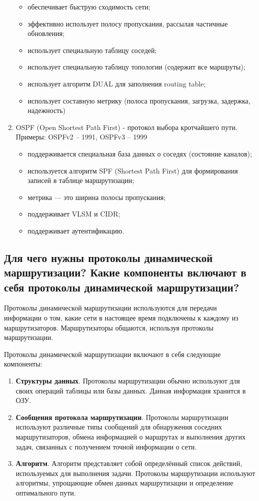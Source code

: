 \begin{enumerate}
\begin{itemize}
		\item обеспечивает быструю сходимость сети;
		\item эффективно использует полосу пропускания,
			рассылая частичные обновления;
		\item использует специальную таблицу соседей;
		\item использует специальную таблицу топологии (содержит все маршруты);
		\item использует алгоритм DUAL для заполнения routing table;
		\item использует составную метрику
			(полоса пропускания, загрузка, задержка, надежность)
	\end{itemize}
	\item OSPF (Open Shortest Path First) - протокол выбора кротчайшего пути.
		Примеры: OSPFv2 – 1991, OSPFv3 – 1999
	\begin{itemize}
		\item поддерживается специальная база данных о соседях
			(состояние каналов);
		\item используется алгоритм SPF (Shortest Path First)
			для формирования записей в таблице маршрутизации;
		\item метрика --- это ширина полосы пропускания;
		\item поддерживает VLSM и CIDR;
		\item поддерживает аутентификацию.
	\end{itemize}
\end{enumerate}

\subsection{Для чего нужны протоколы динамической маршрутизации?
	Какие компоненты включают в себя протоколы динамической маршрутизации?}

Протоколы динамической маршрутизации используются для передачи информации
о том, какие сети в настоящее время подключены к каждому из маршрутизаторов.
Маршрутизаторы общаются, используя протоколы маршрутизации.

Протоколы динамической маршрутизации включают в себя следующие компоненты:

\begin{enumerate}
	\item \textbf{Структуры данных}. Протоколы маршрутизации обычно используют
		для своих операций таблицы или базы данных.
		Данная информация хранится в ОЗУ.
	\item \textbf{Сообщения протокола маршрутизации}.
		Протоколы маршрутизации используют различные типы сообщений
		для обнаружения соседних маршрутизаторов,
		обмена информацией о маршрутах и выполнения других задач,
		связанных с получением точной информации о сети.
	\item \textbf{Алгоритм}. Алгоритм представляет собой определённый
		список действий, используемых для выполнения задачи.
		Протоколы маршрутизации используют алгоритмы,
		упрощающие обмен данных маршрутизации и определение оптимального пути.
\end{enumerate}

